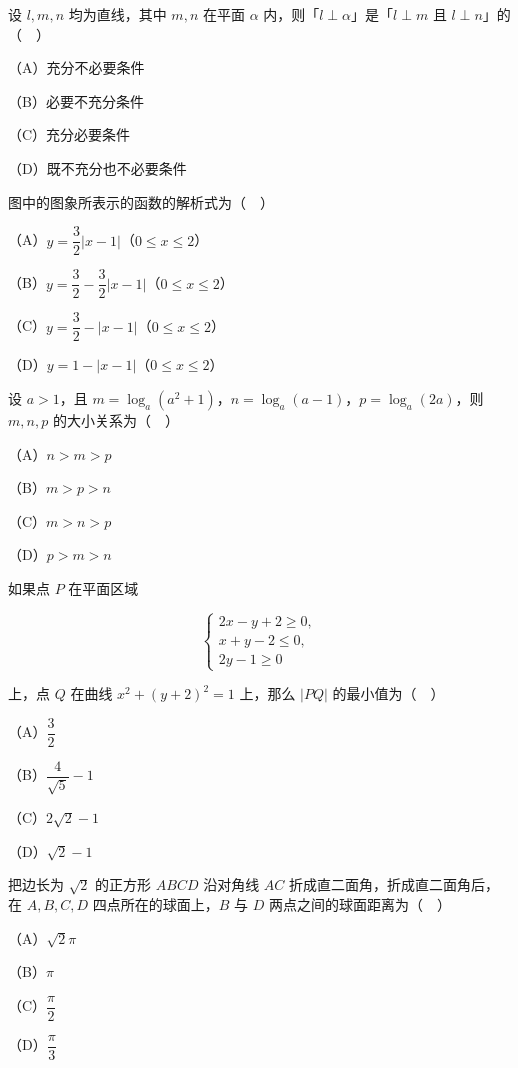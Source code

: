 \begin{question}
设 $l,m,n$ 均为直线，其中 $m,n$ 在平面 $\alpha$ 内，则「$l\perp\alpha$」是「$l\perp m$ 且 $l\perp n$」的（　）

（A）充分不必要条件

（B）必要不充分条件

（C）充分必要条件

（D）既不充分也不必要条件

\Needspace{0.4\textheight}
\end{question}
\begin{question}
图中的图象所表示的函数的解析式为（　）
\nopagebreak[4]
\begin{center}\end{center}
\nopagebreak[4]
（A）$y=\dfrac32|x-1|$（$0\leqslant x\leqslant2$）

（B）$y=\dfrac32-\dfrac32|x-1|$（$0\leqslant x\leqslant2$）

（C）$y=\dfrac32-|x-1|$（$0\leqslant x\leqslant2$）

（D）$y=1-|x-1|$（$0\leqslant x\leqslant2$）

\end{question}
\begin{question}
设 $a>1$，且 $m=\log_a(a^2+1)$，$n=\log_a(a-1)$，$p=\log_a(2a)$，则 $m,n,p$ 的大小关系为（　）

（A）$n>m>p$

（B）$m>p>n$

（C）$m>n>p$

（D）$p>m>n$

\end{question}
\begin{question}
如果点 $P$ 在平面区域

\nopagebreak[4]
\[\begin{cases}2x-y+2\geqslant 0,\\ x+y-2\leqslant 0,\\ 2y-1\geqslant 0\end{cases}\]

上，点 $Q$ 在曲线 $x^2+(y+2)^2=1$ 上，那么 $|PQ|$ 的最小值为（　）

（A）$\dfrac32$

（B）$\dfrac{4}{\sqrt5}-1$

（C）$2\sqrt2-1$

（D）$\sqrt2-1$

\end{question}
\begin{question}
把边长为 $\sqrt2$ 的正方形 $ABCD$ 沿对角线 $AC$ 折成直二面角，折成直二面角后，在 $A,B,C,D$ 四点所在的球面上，$B$ 与 $D$ 两点之间的球面距离为（　）

（A）$\sqrt2\pi$

（B）$\pi$

（C）$\dfrac{\pi}{2}$

（D）$\dfrac{\pi}{3}$

\end{question}
